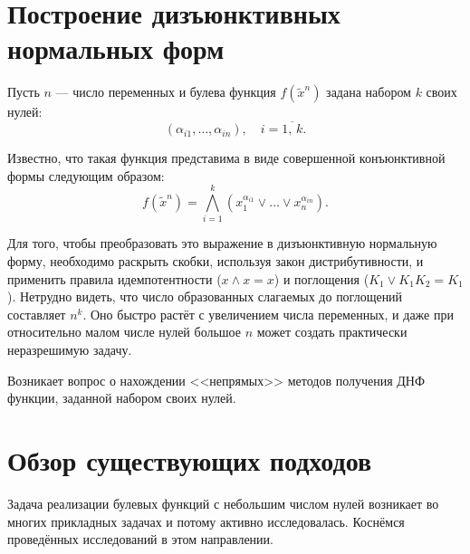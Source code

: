 \documentclass[12pt,a4paper,oneside,fleqn,leqno]{article}
\theoremstyle{definition}
\begin{document}
\newpage
\section*{Построение дизъюнктивных нормальных форм}

	Пусть $n$ --- число переменных и булева функция $f(\tilde x^n)$ задана набором $k$ своих нулей:
	$$
		(\alpha_{i1},\ldots,\alpha_{in}),\quad i=\overline{1,\,k}.
	$$\par
	Известно, что такая функция представима в виде совершенной конъюнктивной формы следующим образом:
	$$
		f(\tilde x^n) = \bigwedge_{i = 1}^k (x_1^{\alpha_{i1}} \vee \ldots \vee x_n^{\alpha_{in}}).
	$$\par
	Для того, чтобы преобразовать это выражение в дизъюнктивную нормальную форму, необходимо раскрыть скобки, используя закон дистрибутивности, и применить правила идемпотентности ($x\wedge x = x$) и поглощения ($K_1 \vee K_1K_2 = K_1$). %
Нетрудно видеть, что число образованных слагаемых до поглощений составляет $n^k.$ Оно быстро растёт с увеличением числа переменных, и даже при относительно малом числе нулей большое $n$ может создать практически неразрешимую задачу.\par
	Возникает вопрос о нахождении <<непрямых>> методов получения ДНФ функции, заданной набором своих нулей.
	\section{Обзор существующих подходов}
		Задача реализации булевых функций с небольшим числом нулей возникает во многих прикладных задачах и потому активно исследовалась. Коснёмся проведённых исследований в этом направлении.
\end{document}
